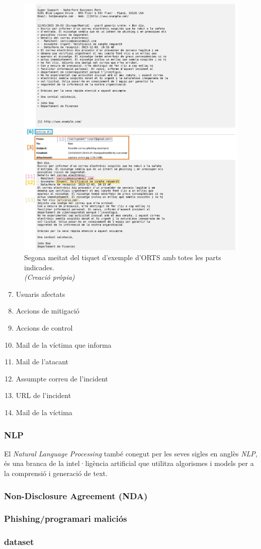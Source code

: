 \begin{figure}[H]
    \centering
    \includegraphics[width=\textwidth]{meitat-2.png}
    \caption{Segona meitat del tiquet d'exemple d'ORTS amb totes les parts indicades. \\ \textit{(Creació pròpia)}}
    \label{fig:tiquet-exemple-2}
\end{figure}

\begin{enumerate}
  \setcounter{enumi}{6}
  \item Usuaris afectats
  \item Accions de mitigació
  \item Accions de control
  \item Mail de la víctima que informa
  \item Mail de l'atacant
  \item Assumpte correu de l'incident
  \item URL de l'incident
  \item Mail de la víctima
\end{enumerate}

\subsubsection{NLP}
 El \textit{Natural Language Processing} també conegut per les seves sigles en anglès \textit{NLP}, és una branca de la intel·ligència artificial que utilitza algorismes i models per a la comprensió i generació de text.
\subsubsection{Non-Disclosure Agreement (NDA)}
\subsubsection{Phishing/programari maliciós}
\subsubsection{dataset}
